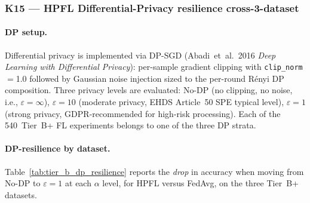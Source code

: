 \documentclass[conference]{IEEEtran}
\begin{document}
\subsubsection*{K15 --- HPFL Differential-Privacy resilience cross-3-dataset}

\paragraph{DP setup.} Differential privacy is implemented via DP-SGD (Abadi~et~al.~2016 \emph{Deep Learning with Differential Privacy}): per-sample gradient clipping with \texttt{clip\_norm}$=$1.0 followed by Gaussian noise injection sized to the per-round R\'enyi DP composition. Three privacy levels are evaluated: No-DP (no clipping, no noise, i.e., $\varepsilon{=}\infty$), $\varepsilon{=}10$ (moderate privacy, EHDS Article~50 SPE typical level), $\varepsilon{=}1$ (strong privacy, GDPR-recommended for high-risk processing). Each of the 540~Tier~B+ FL experiments belongs to one of the three DP strata.

\paragraph{DP-resilience by dataset.} Table~\ref{tab:tier_b_dp_resilience} reports the \emph{drop} in accuracy when moving from No-DP to $\varepsilon{=}1$ at each $\alpha$ level, for HPFL versus FedAvg, on the three Tier~B+ datasets.
\end{document}
